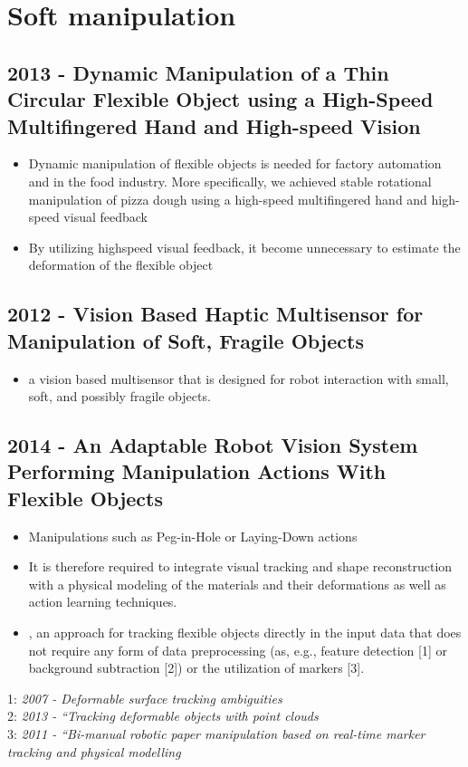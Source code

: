 \vspace{3cm}

\section{Soft manipulation}
\subsection{2013 - Dynamic Manipulation of a Thin Circular Flexible Object using a High-Speed Multifingered Hand and High-speed Vision}
\begin{itemize}
\item Dynamic manipulation of flexible objects is needed
for factory automation and in the food industry. More specifically, we achieved stable rotational manipulation of pizza dough using a high-speed multifingered hand and high-speed visual feedback
\item  By utilizing highspeed visual feedback, it become unnecessary to estimate the deformation of the flexible object
\end{itemize}

\subsection{2012 - Vision Based Haptic Multisensor for Manipulation of Soft, Fragile Objects}
\begin{itemize}
\item a vision based multisensor that is designed for robot interaction with small, soft, and possibly fragile objects. 
\end{itemize}


\subsection{2014 - An Adaptable Robot Vision System Performing Manipulation Actions With Flexible Objects}
\begin{itemize}
\item Manipulations such as Peg-in-Hole or
Laying-Down actions
\item It is therefore required to integrate visual tracking and shape reconstruction with a physical modeling of the materials and their deformations as well as action learning techniques.
\item , an approach for tracking flexible objects directly
in the input data that does not require any form of data preprocessing (as, e.g., feature detection [1] or background subtraction [2]) or the utilization of markers [3].
\end{itemize}
1: \textit{2007 - Deformable surface tracking
ambiguities} \\
2: \textit{2013 - “Tracking deformable objects with point clouds} \\
3: \textit{2011 - “Bi-manual robotic paper manipulation
based on real-time marker tracking and physical modelling}

